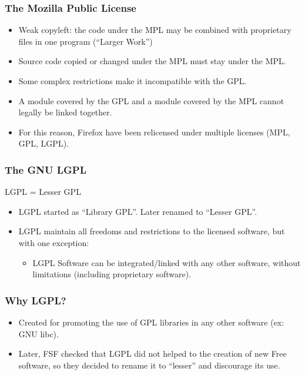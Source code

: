 \begin{frame}
\frametitle{The Mozilla Public License}

\begin{itemize}
\item Weak copyleft: the code under the MPL may be combined with proprietary files in one program (``Larger Work'')
\item Source code copied or changed under the MPL must stay under the MPL.
\item Some complex restrictions make it incompatible with the GPL.
\item A module covered by the GPL and a module covered by the MPL cannot legally be linked together.
\item For this reason, Firefox have been relicensed under multiple licenses (MPL, GPL, LGPL).
\end{itemize}

\end{frame}


\begin{frame}
\frametitle{The GNU LGPL}

\begin{center}
LGPL = Lesser GPL
\end{center}

\begin{itemize}
\item LGPL started as ``Library GPL''. Later renamed to ``Lesser
  GPL''.
\item LGPL maintain all freedoms and restrictions to the licensed
  software, but with one exception:
\begin{itemize}
\item LGPL Software can be integrated/linked with any other software, without
  limitations (including proprietary software).
\end{itemize}
\end{itemize}

\end{frame}


\begin{frame}
\frametitle{Why LGPL?}


\begin{itemize}
\item Created for promoting the use of GPL libraries in any other
  software (ex: GNU libc).
\item Later, FSF checked that LGPL did not helped to the creation of
  new Free software, so they decided to rename it to ``lesser'' and
  discourage its use.
\end{itemize}

\end{frame}


